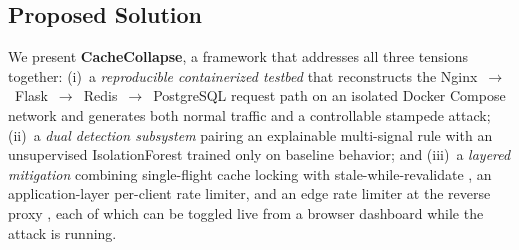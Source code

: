 \subsection{Proposed Solution}
We present \textbf{CacheCollapse}, a framework that addresses all three tensions
together:
(i)~a \emph{reproducible containerized testbed} that reconstructs the
Nginx~$\rightarrow$~Flask~$\rightarrow$~Redis~$\rightarrow$~PostgreSQL request path on
an isolated Docker Compose network \cite{merkel2014,dockercompose} and generates both
normal traffic and a controllable stampede attack;
(ii)~a \emph{dual detection subsystem} pairing an explainable multi-signal rule with
an unsupervised IsolationForest \cite{liu2008,liu2012} trained only on baseline
behavior; and
(iii)~a \emph{layered mitigation} combining single-flight cache locking with
stale-while-revalidate \cite{nishtala2013,rfc5861}, an application-layer per-client
rate limiter, and an edge rate limiter at the reverse proxy \cite{nginxlimitreq}, each
of which can be toggled live from a browser dashboard while the attack is running.

